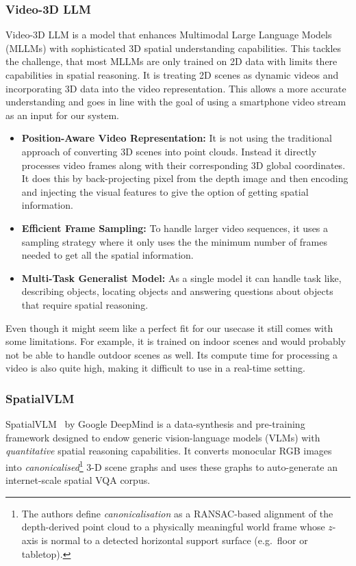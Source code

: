 \subsubsection{Video-3D LLM}
Video-3D LLM is a model that enhances Multimodal Large Language Models (MLLMs) with sophisticated 3D spatial understanding capabilities.
This tackles the challenge, that most MLLMs are only trained on 2D data with limits there capabilities in spatial reasoning.
It is treating 2D scenes as dynamic videos and incorporating 3D data into the video representation.
This allows a more accurate understanding and goes in line with the goal of using a smartphone video stream as an input for our system.

\begin{itemize}
    \item \textbf{Position-Aware Video Representation:} It is not using the traditional approach of converting 3D scenes into point clouds. Instead it directly processes video frames along with their corresponding 3D global coordinates. It does this by back-projecting pixel from the depth image and then encoding and injecting the visual features to give the option of getting spatial information.
    \item \textbf{Efficient Frame Sampling:} To handle larger video sequences, it uses a sampling strategy where it only uses the the minimum number of frames needed to get all the spatial information.
    \item \textbf{Multi-Task Generalist Model:} As a single model it can handle task like, describing objects, locating objects and answering questions about objects that require spatial reasoning.
\end{itemize}

Even though it might seem like a perfect fit for our usecase it still comes with some limitations.
For example, it is trained on indoor scenes and would probably not be able to handle outdoor scenes as well.
Its compute time for processing a video is also quite high, making it difficult to use in a real-time setting. \cite{zheng2024video3dllmlearningpositionaware}

\subsubsection{SpatialVLM}
\label{ssec:spatialvlm}

SpatialVLM~\cite{spatialvlmChen2024} by Google DeepMind is a data-synthesis and pre-training framework designed to endow generic vision-language models (VLMs) with \emph{quantitative} spatial reasoning capabilities.  It converts monocular RGB images into \emph{canonicalised}\footnote{The authors define \emph{canonicalisation} as a RANSAC-based alignment of the depth-derived point cloud to a physically meaningful world frame whose $z$-axis is normal to a detected horizontal support surface (e.g.\ floor or tabletop).} 3-D scene graphs and uses these graphs to auto-generate an internet-scale spatial VQA corpus.

